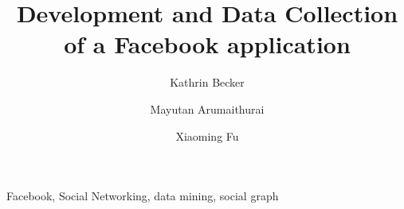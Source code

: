 \documentclass[preprint,authoryear,12pt]{elsarticle}
\begin{document}
\begin{frontmatter}



\title{Development and Data Collection of a Facebook application}



\author[focal]{Kathrin Becker} 
\author[focal]{Mayutan Arumaithurai} %
\author[focal]{Xiaoming Fu} %

\address[focal]{Institute of Computer Science, Computer Networks (NET)
  Research Group, University of G\"ottingen}








\begin{abstract}




\end{abstract}

\begin{keyword}

Facebook, Social Networking, data mining, social graph
\end{keyword}

\end{frontmatter}
\end{document}
